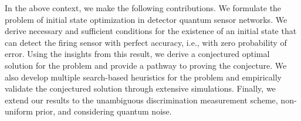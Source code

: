 In the above context, we make the following contributions. 
We formulate the problem of initial state optimization in detector quantum sensor networks. 
We derive necessary and sufficient conditions for the existence of an initial state that can detect the firing sensor with perfect accuracy, i.e., with zero probability of error.
Using the insights from this result, we derive a conjectured optimal solution for the problem and provide a pathway to proving the conjecture. 
We also develop multiple search-based heuristics for the problem and  
empirically validate the conjectured solution 
through extensive simulations. 
Finally, we extend our results to the unambiguous discrimination measurement scheme, non-uniform prior, and considering quantum noise.


